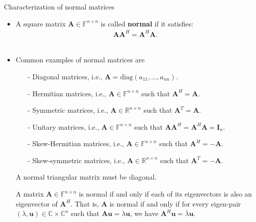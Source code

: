 \documentclass[t,usepdftitle=false]{beamer}
\begin{document}
\begin{frame}{Characterization of normal matrices}
\begin{itemize}
\item A square matrix $\mathbf{A}\in\mathbb{F}^{n \times n}$ is called \textbf{normal} if it satisfies:\vspace{-.05cm}
\begin{align*}
\mathbf{A} \mathbf{A}^H = \mathbf{A}^H \mathbf{A}.
\end{align*}
\vspace{-.55cm}\\
\item Common examples of normal matrices are
\begin{itemize}
\item[-] Diagonal matrices, i.e., $\mathbf{A}=\mathrm{diag}(a_{11},\dots,a_{nn})$.\vspace{.05cm}
\item[-] Hermitian matrices, i.e., $\mathbf{A}\in\mathbb{F}^{n\times n}$ such that  $\mathbf{A}^H = \mathbf{A}$.\vspace{.05cm}
\item[-] Symmetric matrices, i.e., $\mathbf{A}\in\mathbb{R}^{n\times n}$ such that  $\mathbf{A}^T = \mathbf{A}$.\vspace{.05cm}
\item[-] Unitary matrices, i.e., $\mathbf{A}\in\mathbb{F}^{n\times n}$ such that $\mathbf{A} \mathbf{A}^H=\mathbf{A} ^H\mathbf{A} = \mathbf{I}_n$.\vspace{.05cm}
\item[-] Skew-Hermitian matrices, i.e.,  $\mathbf{A}\in\mathbb{F}^{n\times n}$ such that $\mathbf{A}^H = -\mathbf{A}$.\vspace{.05cm}
\item[-] Skew-symmetric matrices, i.e.,  $\mathbf{A}\in\mathbb{R}^{n\times n}$ such that $\mathbf{A}^T = -\mathbf{A}$.
\end{itemize}
\begin{theorem}
A normal triangular matrix must be diagonal.
\end{theorem}
\vspace{-.075cm}
\begin{theorem}
A matrix $\mathbf{A}\in\mathbb{F}^{n \times n}$ is normal if and only if each of its eigenvectors is also an eigenvector of $\mathbf{A}^H$.
That is, $\mathbf{A}$ is normal if and only if for every eigen-pair $(\lambda,\mathbf{u})\in\mathbb{C}\times\mathbb{C}^n$ such that $\mathbf{A}\mathbf{u}=\lambda\mathbf{u}$, we have $\mathbf{A}^H\mathbf{u}=\overline{\lambda}\mathbf{u}$.
\end{theorem}
\end{itemize}
\end{frame}
\end{document}
